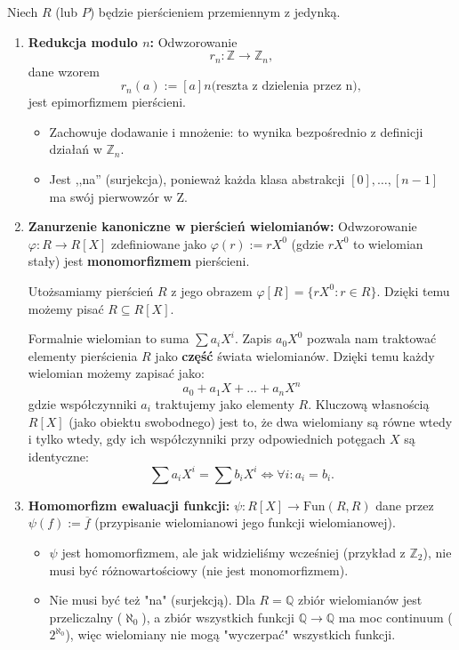 Niech $R$ (lub $P$) będzie pierścieniem przemiennym z jedynką.
\begin{enumerate}[label=\arabic*)] 
	\item \textbf{Redukcja modulo $n$:} Odwzorowanie 
		\[
		r_{n}: \mathbb{Z} \to \mathbb{Z} _{n}
		,\] 
		dane wzorem 
		\[
		r_{n}\left( a \right) := \left[ a \right] n \text{(reszta z dzielenia przez n)}
	,\] 
	jest epimorfizmem pierścieni. 
	\begin{itemize} 
		\item Zachowuje dodawanie i mnożenie: to wynika bezpośrednio z definicji działań w $\mathbb{Z} _{n} $. 
		\item Jest ,,na'' (surjekcja), ponieważ każda klasa abstrakcji $\left[ 0 \right], \ldots, \left[ n-1 \right] $ ma swój pierwowzór w Z. 
	\end{itemize}
\item \textbf{Zanurzenie kanoniczne w pierścień wielomianów:}
Odwzorowanie $\varphi: R \to R[X]$ zdefiniowane jako $\varphi(r) := rX^0$ (gdzie $rX^0$ to wielomian stały) jest \textbf{monomorfizmem}  pierścieni.

Utożsamiamy pierścień $R$ z jego obrazem $\varphi[R] = \{rX^0 : r \in R\}$. Dzięki temu możemy pisać $R \subseteq R[X]$.

\begin{remark}
    Formalnie wielomian to suma $\sum a_i X^i$. Zapis $a_0 X^0$ pozwala nam traktować elementy pierścienia $R$ jako \textbf{część}  świata wielomianów. Dzięki temu każdy wielomian możemy zapisać jako:
    \[ a_0 + a_1 X + \dots + a_n X^n \]
    gdzie współczynniki $a_i$ traktujemy jako elementy $R$.
    Kluczową własnością $R[X]$ (jako obiektu swobodnego) jest to, że dwa wielomiany są równe wtedy i tylko wtedy, gdy ich współczynniki przy odpowiednich potęgach $X$ są identyczne:
    \[ \sum a_i X^i = \sum b_i X^i \iff \forall i: a_i = b_i. \]
\end{remark}

\item \textbf{Homomorfizm ewaluacji funkcji:}
$\psi: R[X] \to \text{Fun}(R, R)$ dane przez $\psi(f) := \overline{f}$ (przypisanie wielomianowi jego funkcji wielomianowej).
\begin{itemize}
    \item $\psi$ jest homomorfizmem, ale jak widzieliśmy wcześniej (przykład z $\mathbb{Z}_2$), nie musi być różnowartościowy (nie jest monomorfizmem).
    \item Nie musi być też "na" (surjekcją). Dla $R = \mathbb{Q}$ zbiór wielomianów jest przeliczalny ($\aleph_0$), a zbiór wszystkich funkcji $\mathbb{Q} \to \mathbb{Q}$ ma moc continuum ($2^{\aleph_0}$), więc wielomiany nie mogą "wyczerpać" wszystkich funkcji.
\end{itemize}


\end{enumerate}
